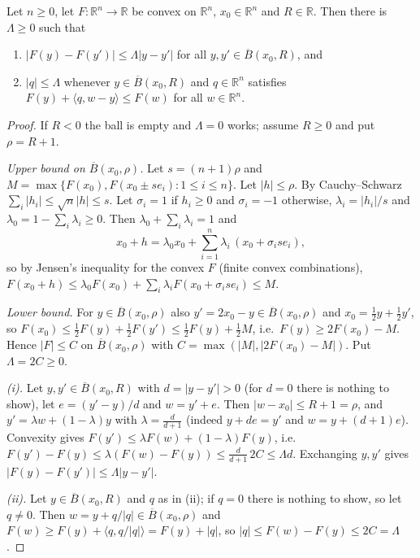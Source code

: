 \begin{lemma}
Let $n\ge0$, let $F:\mathbb R^n\to\mathbb R$ be convex on $\mathbb R^n$, $x_0\in\mathbb R^n$ and $R\in\mathbb R$. Then there is $\Lambda\ge0$ such that
\begin{enumerate}
\item[(i)] $|F(y)-F(y')|\le\Lambda|y-y'|$ for all $y,y'\in\overline B(x_0,R)$, and
\item[(ii)] $|q|\le\Lambda$ whenever $y\in\overline B(x_0,R)$ and $q\in\mathbb R^n$ satisfies $F(y)+\langle q,w-y\rangle\le F(w)$ for all $w\in\mathbb R^n$.
\end{enumerate}
\end{lemma}
\begin{proof}
If $R<0$ the ball is empty and $\Lambda=0$ works; assume $R\ge0$ and put $\rho=R+1$.

\emph{Upper bound on $\overline B(x_0,\rho)$.} Let $s=(n+1)\rho$ and $M=\max\{F(x_0),F(x_0\pm se_i):1\le i\le n\}$. Let $|h|\le\rho$. By Cauchy--Schwarz $\sum_i|h_i|\le\sqrt n|h|\le s$. Let $\sigma_i=1$ if $h_i\ge0$ and $\sigma_i=-1$ otherwise, $\lambda_i=|h_i|/s$ and $\lambda_0=1-\sum_i\lambda_i\ge0$. Then $\lambda_0+\sum_i\lambda_i=1$ and
\[
x_0+h=\lambda_0x_0+\sum_{i=1}^n\lambda_i\,(x_0+\sigma_ise_i),
\]
so by Jensen's inequality for the convex $F$ (finite convex combinations), $F(x_0+h)\le\lambda_0F(x_0)+\sum_i\lambda_iF(x_0+\sigma_ise_i)\le M$.

\emph{Lower bound.} For $y\in\overline B(x_0,\rho)$ also $y'=2x_0-y\in\overline B(x_0,\rho)$ and $x_0=\frac12y+\frac12y'$, so $F(x_0)\le\frac12F(y)+\frac12F(y')\le\frac12F(y)+\frac12M$, i.e.\ $F(y)\ge2F(x_0)-M$. Hence $|F|\le C$ on $\overline B(x_0,\rho)$ with $C=\max(|M|,|2F(x_0)-M|)$. Put $\Lambda=2C\ge0$.

\emph{(i).} Let $y,y'\in\overline B(x_0,R)$ with $d=|y-y'|>0$ (for $d=0$ there is nothing to show), let $e=(y'-y)/d$ and $w=y'+e$. Then $|w-x_0|\le R+1=\rho$, and $y'=\lambda w+(1-\lambda)y$ with $\lambda=\frac d{d+1}$ (indeed $y+d e=y'$ and $w=y+(d+1)e$). Convexity gives $F(y')\le\lambda F(w)+(1-\lambda)F(y)$, i.e.\ $F(y')-F(y)\le\lambda(F(w)-F(y))\le\frac d{d+1}\,2C\le\Lambda d$. Exchanging $y,y'$ gives $|F(y)-F(y')|\le\Lambda|y-y'|$.

\emph{(ii).} Let $y\in\overline B(x_0,R)$ and $q$ as in (ii); if $q=0$ there is nothing to show, so let $q\ne0$. Then $w=y+q/|q|\in\overline B(x_0,\rho)$ and $F(w)\ge F(y)+\langle q,q/|q|\rangle=F(y)+|q|$, so $|q|\le F(w)-F(y)\le2C=\Lambda$.

\end{proof}
